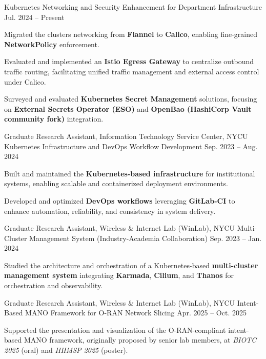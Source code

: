 \begin{cventries}
  {Kubernetes Networking and Security Enhancement for Department Infrastructure} %
  {} %
  {Jul. 2024 -- Present} %
  {
    \begin{cvitems}
      \item {Migrated the clusters networking from \textbf{Flannel} to \textbf{Calico}, enabling fine-grained \textbf{NetworkPolicy} enforcement.}
      \item { Evaluated and implemented an \textbf{Istio Egress Gateway} to centralize outbound traffic routing, facilitating unified traffic management and external access control under Calico.}
      \item {Surveyed and evaluated \textbf{Kubernetes Secret Management} solutions, focusing on \textbf{External Secrets Operator (ESO)} and  \textbf{OpenBao (HashiCorp Vault community fork)} integration.}
    \end{cvitems}
  }

  \cventry
  {Graduate Research Assistant, Information Technology Service Center, NYCU} %
  {Kubernetes Infrastructure and DevOps Workflow Development} %
  {} %
  {Sep. 2023 -- Aug. 2024} %
  {
    \begin{cvitems}
      \item {Built and maintained the \textbf{Kubernetes-based infrastructure} for institutional systems, enabling scalable and containerized deployment environments.}
      \item {Developed and optimized \textbf{DevOps workflows} leveraging \textbf{GitLab-CI} to enhance automation, reliability, and consistency in system delivery.}
    \end{cvitems}
  }

  
  \cventry
    {Graduate Research Assistant, Wireless \& Internet Lab (WinLab), NYCU} %
    {Multi-Cluster Management System (Industry-Academia Collaboration)} %
    {} %
    {Sep. 2023 -- Jan. 2024} %
    {
      \begin{cvitems}
        \item {Studied the architecture and orchestration of a Kubernetes-based \textbf{multi-cluster management system} integrating \textbf{Karmada}, \textbf{Cilium}, and \textbf{Thanos} for orchestration and observability.}
      \end{cvitems}
    }

    
  \cventry
    {Graduate Research Assistant, Wireless \& Internet Lab (WinLab), NYCU} %
    {Intent-Based MANO Framework for O-RAN Network Slicing} %
    {} %
    {Apr. 2025 -- Oct. 2025} %
    {
      \begin{cvitems}
        \item {Supported the presentation and visualization of the O-RAN-compliant intent-based MANO framework, originally proposed by senior lab members, at \textit{BIOTC 2025} (oral) and \textit{IIHMSP 2025} (poster).}
      \end{cvitems}
    }
 
\end{cventries}

